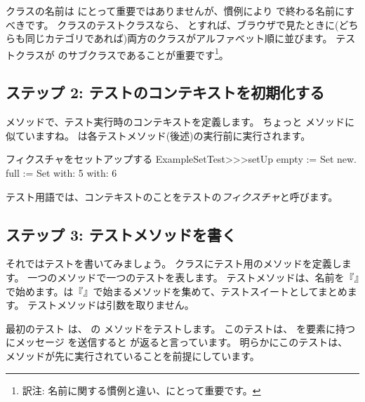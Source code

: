 \documentclass[a4paper,10pt,twoside]{book}
\begin{document}
クラスの名前は \sunit にとって重要ではありませんが、慣例により  で終わる名前にすべきです。
 クラスのテストクラスなら、 とすれば、ブラウザで見たときに(どちらも同じカテゴリであれば)両方のクラスがアルファベット順に並びます。
テストクラスが  のサブクラスであることが重要です\footnote{訳注: 名前に関する慣例と違い、\sunit にとって重要です。}。
\subsection{ステップ 2: テストのコンテキストを初期化する}

 メソッドで、テスト実行時のコンテキストを定義します。
ちょっと  メソッドに似ていますね。
 は各テストメソッド(後述)の実行前に実行されます。


\begin{method}[setupExampleSetTest]{フィクスチャをセットアップする}
ExampleSetTest>>>setUp
	empty := Set new.
	full := Set with: 5 with: 6
\end{method}

\noindent
テスト用語では、コンテキストのことをテストの\emph{フィクスチャ}と呼びます。

\subsection{ステップ 3: テストメソッドを書く}

それではテストを書いてみましょう。
 クラスにテスト用のメソッドを定義します。
一つのメソッドで一つのテストを表します。
テストメソッドは、名前を『』で始めます。\sunit は『』で始まるメソッドを集めて、テストスイートとしてまとめます。
テストメソッドは引数を取りません。

最初のテスト  は、 の  メソッドをテストします。
このテストは、 を要素に持つ  にメッセージ  を送信すると  が返ると言っています。
明らかにこのテストは、 メソッドが先に実行されていることを前提にしています。
\end{document}
